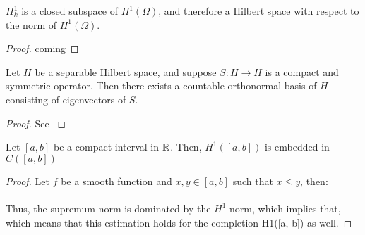 \begin{atheorem}
	$H^{1}_{k}$ is a closed subspace of $H^{1}(\Omega)$, and therefore a  Hilbert space with respect to the norm of $H^{1}(\Omega)$.
	
	\begin{proof} %
		coming
	\end{proof}
\end{atheorem}

\begin{atheorem}
	Let $H$ be a separable Hilbert space, and suppose $S \colon H \rightarrow H$ is a compact and symmetric operator. Then there exists a countable orthonormal basis of $H$ consisting of eigenvectors of $S$.
	
	\begin{proof}
		See \cite[page 645]{evans1998partial}
	\end{proof}
\end{atheorem}

\begin{atheorem}
	Let $[a, b]$ be a compact interval in $\mathbb{R}$. Then, $H^{1}([a, b])$ is embedded in $C([a, b])$
	
	\begin{proof}
		Let $f$ be a smooth function and $x, y \in [a, b]$ such that $x \leq y$, then:
		~\\ ~\\ %
		Thus, the supremum norm is dominated by the $H^{1}$-norm, which implies that, which means that this estimation holds for the completion H1([a, b]) as well.
	\end{proof}
\end{atheorem}

